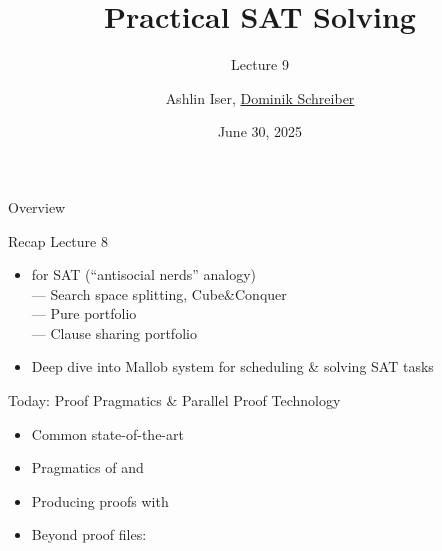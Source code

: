 \documentclass[t,english]{sdqbeamer}
\title{Practical SAT Solving}
\subtitle{Lecture 9 \unimp{\normalfont -- Proof Pragmatics \& Parallel Proof Technology}}
\author{{Ashlin Iser}, \underline{Dominik Schreiber}}
\date{June 30, 2025}
\begin{document}
\begin{frame}[title white horizontal, picture=logos/blender-render, kitlogo=rgb]
	\titlepage
\end{frame}

\begin{frame}{Overview}
	\begin{block}{Recap Lecture 8}
		\begin{itemize}
			\item {} for SAT (``antisocial nerds'' analogy)\\
			--- Search space splitting, Cube\&Conquer\\
			--- Pure portfolio\\
			--- Clause sharing portfolio
			\item Deep dive into Mallob system for scheduling \& solving SAT tasks
		\end{itemize}
	\end{block}
	\begin{blueblock}{Today: Proof Pragmatics \& Parallel Proof Technology}
		\begin{itemize}
			\item Common state-of-the-art 
			\item Pragmatics of  and 
			\item Producing proofs with 
			\item Beyond proof files: 
		\end{itemize}
	\end{blueblock}
	
\end{frame}
\end{document}
